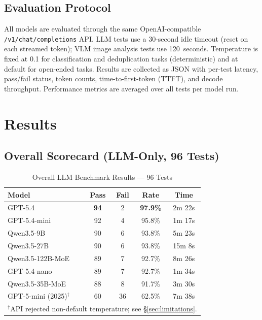 \documentclass[onecolumn,10pt]{IEEEtran}
\begin{document}
\subsection{Evaluation Protocol}

All models are evaluated through the same OpenAI-compatible
\texttt{/v1/chat/completions} API. LLM tests use a 30-second idle
timeout (reset on each streamed token); VLM image analysis tests
use 120~seconds. Temperature is fixed at 0.1 for classification and
deduplication tasks (deterministic) and at default for open-ended
tasks. Results are collected as JSON with per-test latency, pass/fail
status, token counts, time-to-first-token (TTFT), and decode throughput.
Performance metrics are averaged over all tests per model run.


\section{Results}

\subsection{Overall Scorecard (LLM-Only, 96 Tests)}

\begin{table}[h]
\centering
\caption{Overall LLM Benchmark Results — 96 Tests}
\label{tab:overall}
\small
\begin{tabular}{p{2.5cm}cccc}
\toprule
\textbf{Model} & \textbf{Pass} & \textbf{Fail} & \textbf{Rate} & \textbf{Time} \\
\midrule
GPT-5.4 & \textbf{94} & 2 & \textbf{97.9\%} & 2m 22s \\
GPT-5.4-mini & 92 & 4 & 95.8\% & 1m 17s \\
Qwen3.5-9B & 90 & 6 & 93.8\% & 5m 23s \\
Qwen3.5-27B & 90 & 6 & 93.8\% & 15m 8s \\
Qwen3.5-122B-MoE & 89 & 7 & 92.7\% & 8m 26s \\
GPT-5.4-nano & 89 & 7 & 92.7\% & 1m 34s \\
Qwen3.5-35B-MoE & 88 & 8 & 91.7\% & 3m 30s \\
GPT-5-mini (2025)$^\dagger$ & 60 & 36 & 62.5\% & 7m 38s \\
\midrule
\multicolumn{5}{l}{\footnotesize $^\dagger$API rejected non-default temperature; see §\ref{sec:limitations}.}
\end{tabular}
\end{table}
\end{document}
